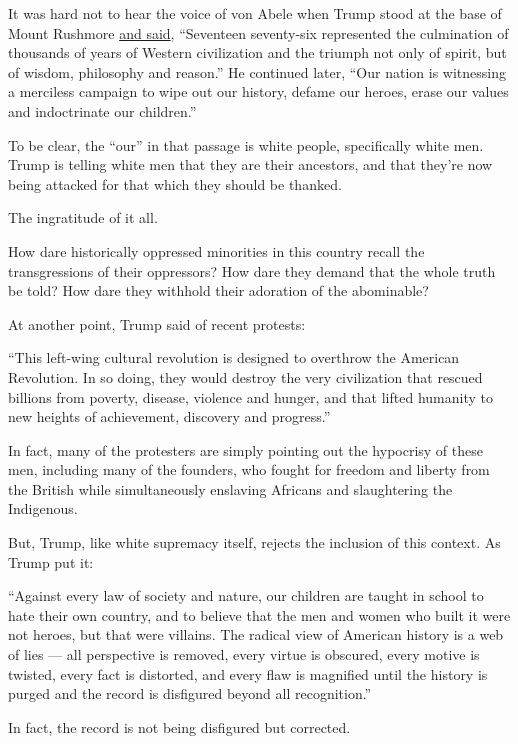 It was hard not to hear the voice of von Abele when Trump stood at the
base of Mount Rushmore
\href{https://www.whitehouse.gov/briefings-statements/remarks-president-trump-south-dakotas-2020-mount-rushmore-fireworks-celebration-keystone-south-dakota/}{and
said}, ``Seventeen seventy-six represented the culmination of thousands
of years of Western civilization and the triumph not only of spirit, but
of wisdom, philosophy and reason.'' He continued later, ``Our nation is
witnessing a merciless campaign to wipe out our history, defame our
heroes, erase our values and indoctrinate our children.''

To be clear, the ``our'' in that passage is white people, specifically
white men. Trump is telling white men that they are their ancestors, and
that they're now being attacked for that which they should be thanked.

The ingratitude of it all.

How dare historically oppressed minorities in this country recall the
transgressions of their oppressors? How dare they demand that the whole
truth be told? How dare they withhold their adoration of the abominable?

At another point, Trump said of recent protests:

``This left-wing cultural revolution is designed to overthrow the
American Revolution. In so doing, they would destroy the very
civilization that rescued billions from poverty, disease, violence and
hunger, and that lifted humanity to new heights of achievement,
discovery and progress.''

In fact, many of the protesters are simply pointing out the hypocrisy of
these men, including many of the founders, who fought for freedom and
liberty from the British while simultaneously enslaving Africans and
slaughtering the Indigenous.

But, Trump, like white supremacy itself, rejects the inclusion of this
context. As Trump put it:

``Against every law of society and nature, our children are taught in
school to hate their own country, and to believe that the men and women
who built it were not heroes, but that were villains. The radical view
of American history is a web of lies --- all perspective is removed,
every virtue is obscured, every motive is twisted, every fact is
distorted, and every flaw is magnified until the history is purged and
the record is disfigured beyond all recognition.''

In fact, the record is not being disfigured but corrected.


